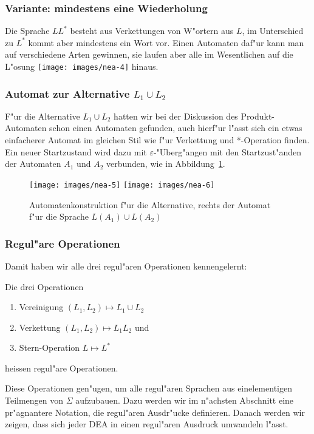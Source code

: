 \subsubsection{Variante: mindestens eine Wiederholung}
Die Sprache $LL^*$ besteht aus Verkettungen von W"ortern aus $L$,
im Unterschied zu $L^*$ kommt aber mindestens ein Wort vor.
Einen Automaten daf"ur kann man auf verschiedene Arten gewinnen,
sie laufen aber alle im Wesentlichen auf die L"osung
\texttt{[image: images/nea-4]}
hinaus.

\subsubsection{Automat zur Alternative $L_1\cup L_2$}
F"ur die Alternative $L_1\cup L_2$ hatten wir bei der Diskussion
des Produkt-Automaten schon einen Automaten gefunden, auch
hierf"ur l"asst sich ein etwas einfacherer Automat im gleichen
Stil wie f"ur Verkettung und *-Operation finden. Ein neuer Startzustand
wird dazu mit $\varepsilon$-"Uberg"angen mit den Startzust"anden
der Automaten $A_1$ und $A_2$ verbunden, wie in Abbildung~\ref{neaalternative}.
\begin{figure}
\begin{center}
\texttt{[image: images/nea-5]}
\qquad
\qquad
\texttt{[image: images/nea-6]}
\end{center}
\caption{Automatenkonstruktion f"ur die Alternative, rechts der Automat
f"ur die Sprache $L(A_1)\cup L(A_2)$\label{neaalternative}}
\end{figure}

\subsubsection{Regul"are Operationen}
Damit haben wir alle drei regul"aren Operationen kennengelernt:

\begin{definition}
Die drei Operationen
\begin{enumerate}
\item Vereinigung $(L_1,L_2)\mapsto L_1\cup L_2$
\item Verkettung $(L_1,L_2)\mapsto L_1L_2$ und
\item Stern-Operation $L\mapsto L^*$
\end{enumerate}
heissen regul"are Operationen.
\end{definition}

Diese Operationen gen"ugen, um alle regul"aren Sprachen aus
einelementigen Teilmengen von $\Sigma$ aufzubauen.
Dazu werden wir im n"achsten Abschnitt eine pr"agnantere Notation,
die regul"aren Ausdr"ucke definieren. Danach werden wir zeigen,
dass sich jeder DEA in einen regul"aren Ausdruck umwandeln l"asst.

